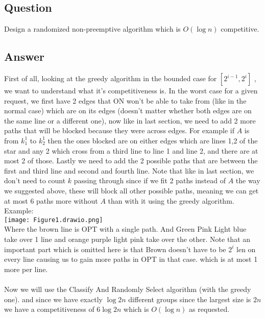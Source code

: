 \subsection*{Question}
Design a randomized non-preemptive algorithm which is $O(\log n)$ competitive.

\subsection*{Answer}
First of all, looking at the greedy algorithm in the bounded case for $\left[2^{i-1},2^i\right]$ , we want to understand what it's competitiveness is. In the worst case for a given request, we first have 2 edges that ON won't be able to take from (like in the normal case) which are on its edges (doesn't matter whether both edges are on the same line or a different one), now like in last section, we need to add 2 more paths that will be blocked because they were across edges. For example if $A$ is from $k_1^1$ to $k_2^1$ then the ones blocked are on either edges which are lines 1,2 of the star and any 2 which cross from a third line to line 1 and line 2, and there are at most 2 of those. Lastly we need to add the 2 possible paths that are between the first and third line and second and fourth line. Note that like in last section, we don't need to count $k$ passing through since if we fit 2 paths instead of $A$ the way we suggested above, these will block all other possible paths, meaning we can get at most 6 paths more without $A$ than with it using the greedy algorithm.\\
Example:\\
\texttt{[image: Figure1.drawio.png]}\\

Where the brown line is OPT with a single path. And Green Pink Light blue take over 1 line and orange purple light pink take over the other. Note that an important part which is omitted here is that Brown doesn't have to be $2^i$ len on every line causing us to gain more paths in OPT in that case. which is at most 1 more per line.\\\\
Now we will use the Classify And Randomly Select algorithm (with the greedy one). and since we have exactly $\log 2n$ different groups since the largest size is $2n$ we have a competitiveness of $6\log 2n$ which is $O(\log n)$ as requested.